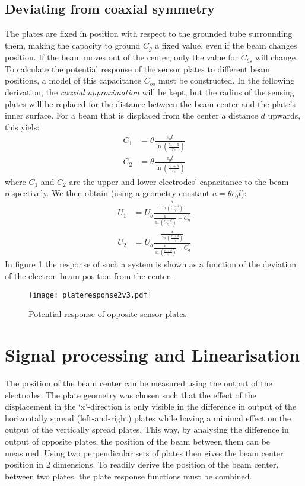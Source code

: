 \subsection{Deviating from coaxial symmetry}
The plates are fixed in position with respect to the grounded tube surrounding them, making the capacity to ground $C_g$ a fixed value, even if the beam changes position. If the beam moves out of the center, only the value for $C_{bs}$ will change.
To calculate the potential response of the sensor plates to different beam positions, a model of this capacitance $C_{bs}$ must be constructed. 
In the following derivation, the \textit{coaxial approximation} will be kept, but the radius of the sensing plates will be replaced for the distance between the beam center and the plate's inner surface. For a beam that is displaced from the center a distance $d$ upwards, this yiels:
\begin{align}
C_1 &= \theta \frac{\epsilon_0l}{\ln\left(\frac{r_s-d}{r_b}\right)} \\
C_2 &= \theta \frac{\epsilon_0l}{\ln\left(\frac{r_s+d}{r_b}\right)}
\end{align}
where $C_1$ and $C_2$ are the upper and lower electrodes' capacitance to the beam respectively.
We then obtain (using a geometry constant $a=\theta\epsilon_0l$):
\begin{align}
U_1 &= U_b\frac{\frac{a}{\ln\left(\frac{r_s-d}{r_b}\right)}}{\frac{a}{\ln\left(\frac{r_s-d}{r_b}\right)}+C_g^\prime} \\
U_2 &= U_b\frac{\frac{a}{\ln\left(\frac{r_s+d}{r_b}\right)}}{\frac{a}{\ln\left(\frac{r_s+d}{r_b}\right)}+C_g^\prime} \label{eq:plateresponse}
\end{align}
In figure \ref{fig:plateresponse} the response of such a system is shown as a function of the deviation of the electron beam position from the center.
\begin{figure}[hb!]
\centering
\texttt{[image: plateresponse2v3.pdf]}
\caption{Potential response of opposite sensor plates}
\label{fig:plateresponse}
\end{figure}

\newpage
\section{Signal processing and Linearisation}
The position of the beam center can be measured using the output of the electrodes. The plate geometry was chosen such that the effect of the displacement in the `x'-direction is only visible in the difference in output of the horizontally spread (left-and-right) plates while having a minimal effect on the output of the vertically spread plates. This way, by analysing the difference in output of opposite plates, the position of the beam between them can be measured. Using two perpendicular sets of plates then gives the beam center position in 2 dimensions. 
To readily derive the position of the beam center, between two plates, the plate response functions must be combined.
